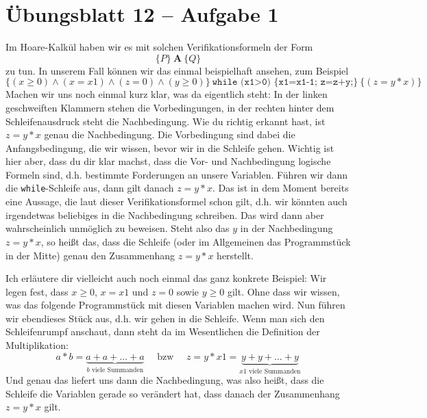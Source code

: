 \documentclass[ngerman,a4paper, 11pt]{article}
\begin{document}
	\pagestyle{empty}
	
	\section*{Übungsblatt 12 -- Aufgabe 1}
	
	Im Hoare-Kalkül haben wir es mit solchen Verifikationsformeln der Form
	\begin{equation*}
		\{P\} \ \mathbf{A} \ \{Q\}
	\end{equation*}
	zu tun. In unserem Fall können wir das einmal beispielhaft ansehen, zum Beispiel
	\begin{equation*}
		\{(x \ge 0) \land (x = x1) \land (z = 0) \land (y \ge 0)\} \ \texttt{while (x1>0) \{x1=x1-1; z=z+y;\}} \ \{(z = y * x)\}
	\end{equation*}
	Machen wir uns noch einmal kurz klar, was da eigentlich steht: In der linken geschweiften Klammern stehen die Vorbedingungen, in der rechten hinter dem Schleifenausdruck steht die Nachbedingung. Wie du richtig erkannt hast, ist $z = y*x$ genau die Nachbedingung. Die Vorbedingung sind dabei die Anfangsbedingung, die wir wissen, bevor wir in die Schleife gehen. Wichtig ist hier aber, dass du dir klar machst, dass die Vor- und Nachbedingung logische Formeln sind, d.h. bestimmte Forderungen an unsere Variablen. Führen wir dann die \texttt{while}-Schleife aus, dann gilt danach $z = y*x$. Das ist in dem Moment bereits eine Aussage, die laut dieser Verifikationsformel schon gilt, d.h. wir könnten auch irgendetwas beliebiges in die Nachbedingung schreiben. Das wird dann aber wahrscheinlich unmöglich zu beweisen. Steht also das $y$ in der Nachbedingung $z = y*x$, so heißt das, dass die Schleife (oder im Allgemeinen das Programmstück in der Mitte) genau den Zusammenhang $z = y*x$ herstellt. 
	
	Ich erläutere dir vielleicht auch noch einmal das ganz konkrete Beispiel: Wir legen fest, dass $x \ge 0$, $x=x1$ und $z=0$ sowie $y \ge 0$ gilt. Ohne dass wir wissen, was das folgende Programmstück mit diesen Variablen machen wird. Nun führen wir ebendieses Stück aus, d.h. wir gehen in die Schleife. Wenn man sich den Schleifenrumpf anschaut, dann steht da im Wesentlichen die Definition der Multiplikation:
	\begin{equation*}
		a*b = \underbrace{a + a + \dots + a}_{b \text{ viele Summanden}} \quad \text{ bzw } \quad z = y * x1 = \underbrace{y + y + \dots + y}_{x1 \text{ viele Summanden}}
	\end{equation*}
	Und genau das liefert uns dann die Nachbedingung, was also heißt, dass die Schleife die Variablen gerade so verändert hat, dass danach der Zusammenhang $z = y*x$ gilt. 
	
\end{document}
